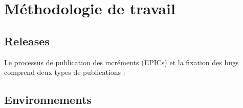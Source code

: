 \renewcommand{\thesection}{\Alph{section}}
\section{Méthodologie de travail}\label{appendix:methodologie}

\subsection{Releases}
Le processus de publication des incréments (EPICs) et la fixation des bugs comprend deux types de publications :

\subsection{Environnements}


